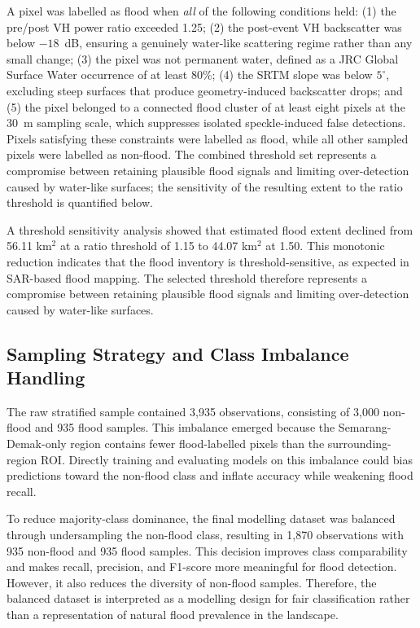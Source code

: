 \documentclass[11pt,twoside]{article}
\begin{document}
A pixel was labelled as flood when \emph{all} of the following conditions
held: (1) the pre/post VH power ratio exceeded 1.25; (2) the post-event VH
backscatter was below $-18$~dB, ensuring a genuinely water-like scattering
regime rather than any small change; (3) the pixel was not permanent water,
defined as a JRC Global Surface Water occurrence of at least 80\%; (4) the SRTM
slope was below $5^{\circ}$, excluding steep surfaces that produce
geometry-induced backscatter drops; and (5) the pixel belonged to a connected
flood cluster of at least eight pixels at the 30~m sampling scale, which
suppresses isolated speckle-induced false detections. Pixels satisfying these
constraints were labelled as flood, while all other sampled pixels were
labelled as non-flood. The combined threshold set represents a compromise
between retaining plausible flood signals and limiting over-detection caused by
water-like surfaces; the sensitivity of the resulting extent to the ratio
threshold is quantified below.
 
A threshold sensitivity analysis showed that estimated flood extent declined
from 56.11 km$^2$ at a ratio threshold of 1.15 to 44.07 km$^2$ at 1.50. This
monotonic reduction indicates that the flood inventory is threshold-sensitive,
as expected in SAR-based flood mapping. The selected threshold therefore
represents a compromise between retaining plausible flood signals and limiting
over-detection caused by water-like surfaces.
 
\subsection{Sampling Strategy and Class Imbalance Handling}\label{sampling-strategy-and-class-imbalance-handling}
 
The raw stratified sample contained 3,935 observations, consisting of 3,000
non-flood and 935 flood samples. This imbalance emerged because the
Semarang-Demak-only region contains fewer flood-labelled pixels than the
surrounding-region ROI. Directly training and evaluating models on this
imbalance could bias predictions toward the non-flood class and inflate accuracy
while weakening flood recall.
 
To reduce majority-class dominance, the final modelling dataset was balanced
through undersampling the non-flood class, resulting in 1,870 observations with
935 non-flood and 935 flood samples. This decision improves class comparability
and makes recall, precision, and F1-score more meaningful for flood detection.
However, it also reduces the diversity of non-flood samples. Therefore, the
balanced dataset is interpreted as a modelling design for fair classification
rather than a representation of natural flood prevalence in the landscape.
 
\end{document}
